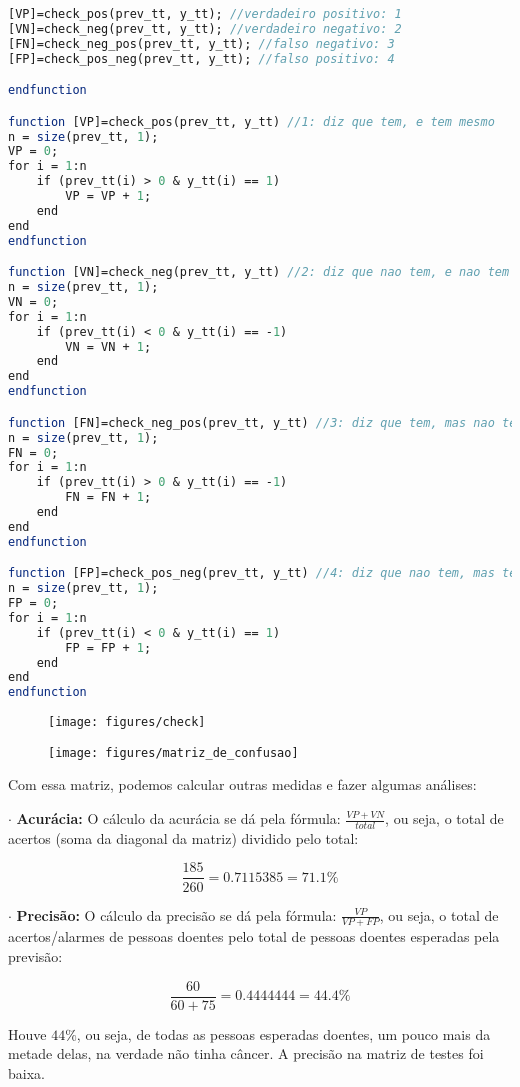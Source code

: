 \documentclass[leqno]{article}
\numberwithin{equation}{section}
\begin{document}
\begin{enumerate}
\begin{sol}
\begin{lstlisting}[style=mystyle, language=Scilab]
[VP]=check_pos(prev_tt, y_tt); //verdadeiro positivo: 1
[VN]=check_neg(prev_tt, y_tt); //verdadeiro negativo: 2
[FN]=check_neg_pos(prev_tt, y_tt); //falso negativo: 3
[FP]=check_pos_neg(prev_tt, y_tt); //falso positivo: 4

endfunction

function [VP]=check_pos(prev_tt, y_tt) //1: diz que tem, e tem mesmo
n = size(prev_tt, 1);
VP = 0;
for i = 1:n
	if (prev_tt(i) > 0 & y_tt(i) == 1)
		VP = VP + 1;
	end
end
endfunction

function [VN]=check_neg(prev_tt, y_tt) //2: diz que nao tem, e nao tem
n = size(prev_tt, 1);
VN = 0;
for i = 1:n
	if (prev_tt(i) < 0 & y_tt(i) == -1)
		VN = VN + 1;
	end
end
endfunction

function [FN]=check_neg_pos(prev_tt, y_tt) //3: diz que tem, mas nao tem
n = size(prev_tt, 1);
FN = 0;
for i = 1:n
	if (prev_tt(i) > 0 & y_tt(i) == -1)
		FN = FN + 1;
	end
end
endfunction

function [FP]=check_pos_neg(prev_tt, y_tt) //4: diz que nao tem, mas tem 
n = size(prev_tt, 1);
FP = 0;
for i = 1:n
	if (prev_tt(i) < 0 & y_tt(i) == 1)
		FP = FP + 1;
	end
end
endfunction
	\end{lstlisting}	
\end{sol}

	\begin{figure}[H]
		\centering
		\texttt{[image: figures/check]}
	\end{figure}
	
	\begin{figure}[H]
		\centering
		\texttt{[image: figures/matriz\_de\_confusao]}
	\end{figure}

	Com essa matriz, podemos calcular outras medidas e fazer algumas análises:
	
	$\cdot$ \textbf{{\large Acurácia:}}
	O cálculo da acurácia se dá pela fórmula: $\frac{VP + VN}{total}$, ou seja, o total de acertos (soma da diagonal da matriz) dividido pelo total:
	
	$$\frac{185}{260} = 0.7115385 = 71.1\% $$
	
	$\cdot$ \textbf{{\large Precisão:}} 
	O cálculo da precisão se dá pela fórmula: $\frac{VP}{VP + FP}$, ou seja, o total de acertos/alarmes de pessoas doentes pelo total de pessoas doentes esperadas pela previsão:
	
	$$\frac{60}{60 + 75} = 0.4444444 = 44.4\% $$
	
	Houve $44\%$, ou seja, de todas as pessoas esperadas doentes, um pouco mais da metade delas, na verdade não tinha câncer. A precisão na matriz de testes foi baixa.
	

\end{enumerate}
\end{document}
